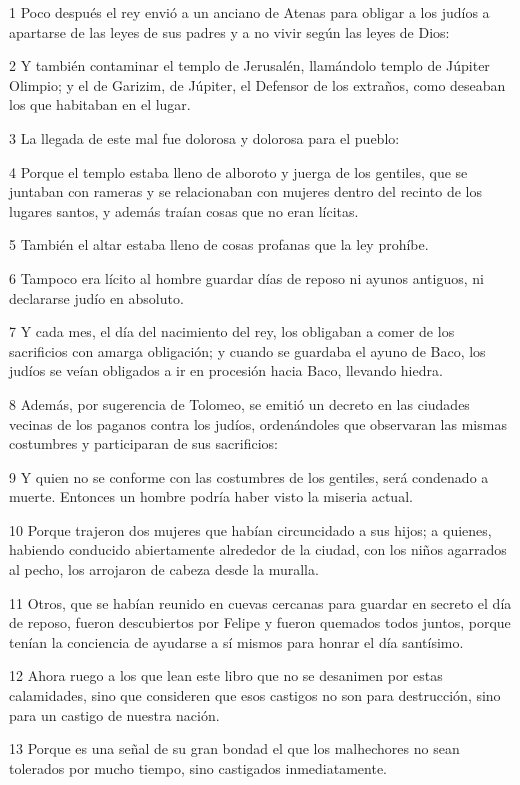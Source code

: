 \par 1 Poco después el rey envió a un anciano de Atenas para obligar a los judíos a apartarse de las leyes de sus padres y a no vivir según las leyes de Dios:
\par 2 Y también contaminar el templo de Jerusalén, llamándolo templo de Júpiter Olimpio; y el de Garizim, de Júpiter, el Defensor de los extraños, como deseaban los que habitaban en el lugar.
\par 3 La llegada de este mal fue dolorosa y dolorosa para el pueblo:
\par 4 Porque el templo estaba lleno de alboroto y juerga de los gentiles, que se juntaban con rameras y se relacionaban con mujeres dentro del recinto de los lugares santos, y además traían cosas que no eran lícitas.
\par 5 También el altar estaba lleno de cosas profanas que la ley prohíbe.
\par 6 Tampoco era lícito al hombre guardar días de reposo ni ayunos antiguos, ni declararse judío en absoluto.
\par 7 Y cada mes, el día del nacimiento del rey, los obligaban a comer de los sacrificios con amarga obligación; y cuando se guardaba el ayuno de Baco, los judíos se veían obligados a ir en procesión hacia Baco, llevando hiedra.
\par 8 Además, por sugerencia de Tolomeo, se emitió un decreto en las ciudades vecinas de los paganos contra los judíos, ordenándoles que observaran las mismas costumbres y participaran de sus sacrificios:
\par 9 Y quien no se conforme con las costumbres de los gentiles, será condenado a muerte. Entonces un hombre podría haber visto la miseria actual.
\par 10 Porque trajeron dos mujeres que habían circuncidado a sus hijos; a quienes, habiendo conducido abiertamente alrededor de la ciudad, con los niños agarrados al pecho, los arrojaron de cabeza desde la muralla.
\par 11 Otros, que se habían reunido en cuevas cercanas para guardar en secreto el día de reposo, fueron descubiertos por Felipe y fueron quemados todos juntos, porque tenían la conciencia de ayudarse a sí mismos para honrar el día santísimo.
\par 12 Ahora ruego a los que lean este libro que no se desanimen por estas calamidades, sino que consideren que esos castigos no son para destrucción, sino para un castigo de nuestra nación.
\par 13 Porque es una señal de su gran bondad el que los malhechores no sean tolerados por mucho tiempo, sino castigados inmediatamente.
